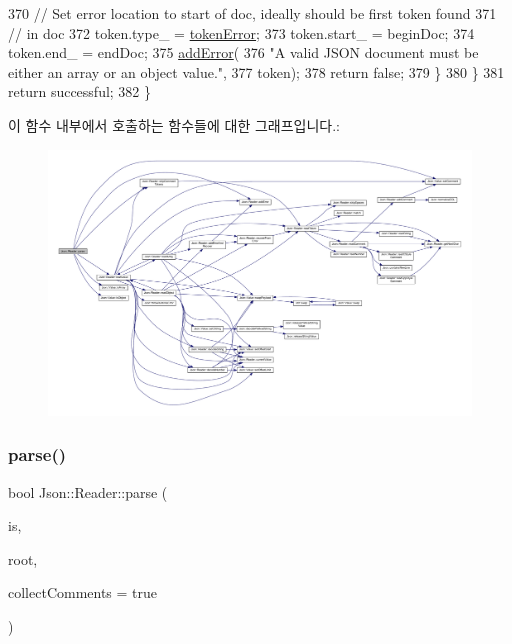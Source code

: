 \begin{DoxyCode}
370       \textcolor{comment}{// Set error location to start of doc, ideally should be first token found}
371       \textcolor{comment}{// in doc}
372       token.type\_ = \hyperlink{class_json_1_1_reader_aa35e6ab574dc399a0a645ad98ed66bc9a55d1ab9135c3d068b57fafdbabfa569a}{tokenError};
373       token.start\_ = beginDoc;
374       token.end\_ = endDoc;
375       \hyperlink{class_json_1_1_reader_af02176a1d2786b4415bbb00a1b10bb6b}{addError}(
376           \textcolor{stringliteral}{"A valid JSON document must be either an array or an object value."},
377           token);
378       \textcolor{keywordflow}{return} \textcolor{keyword}{false};
379     \}
380   \}
381   \textcolor{keywordflow}{return} successful;
382 \}
\end{DoxyCode}
이 함수 내부에서 호출하는 함수들에 대한 그래프입니다.\+:\nopagebreak
\begin{figure}[H]
\begin{center}
\leavevmode
\includegraphics[width=350pt]{class_json_1_1_reader_ac71ef2b64c7c27b062052e692af3fb32_cgraph}
\end{center}
\end{figure}
\mbox{\label{class_json_1_1_reader_a6d5d0e23f68749d2f17feece4ccf504d}} 
\subsubsection{\texorpdfstring{parse()}{parse()}\hspace{0.1cm}{\footnotesize\ttfamily [3/3]}}
{\footnotesize\ttfamily bool Json\+::\+Reader\+::parse (\begin{DoxyParamCaption}\item[{\hyperlink{json_8h_a15f2f70b2ce0a2abd0f8112393dbc4de}{J\+S\+O\+N\+C\+P\+P\+\_\+\+I\+S\+T\+R\+E\+AM} \&}]{is,  }\item[{\hyperlink{class_json_1_1_value}{Value} \&}]{root,  }\item[{bool}]{collect\+Comments = {\ttfamily true} }\end{DoxyParamCaption})}



